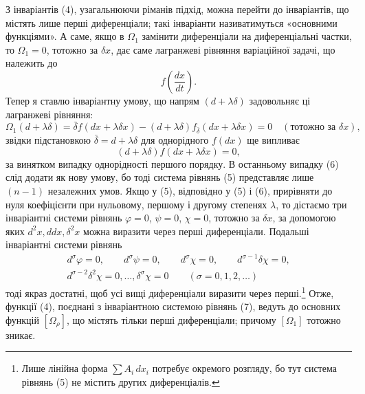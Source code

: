 \documentclass[11pt]{article}
\providecommand{\bdelta}{\bar{\delta}}
\begin{document}
З інваріантів (4), узагальнюючи ріманів підхід, можна перейти до інваріантів, що містять лише перші диференціали; такі інваріанти називатимуться «основними функціями». А саме, якщо в \(\Omega_1\) замінити диференціали на диференціальні частки, то \(\Omega_1=0\), тотожно за \(\delta x\), дає саме лагранжеві рівняння варіаційної задачі, що належить до
\[
f\!\left(\frac{dx}{dt}\right).
\]
Тепер я ставлю інваріантну умову, що напрям \((d+\lambda\delta)\) задовольняє ці лагранжеві рівняння:
\begin{equation}
\Omega_1(d+\lambda\delta)=
\bdelta f(dx+\lambda\delta x)
-(d+\lambda\delta)f_{\bdelta}(dx+\lambda\delta x)=0
\quad(\text{тотожно за }\delta x),
\tag{5}
\end{equation}
звідки підстановкою \(\bdelta=d+\lambda\delta\) для однорідного \(f(dx)\) ще випливає
\begin{equation}
(d+\lambda\delta)f(dx+\lambda\delta x)=0,
\tag{6}
\end{equation}
за винятком випадку однорідності першого порядку. В останньому випадку (6) слід додати як нову умову, бо тоді система рівнянь (5) представляє лише \((n-1)\) незалежних умов. Якщо у (5), відповідно у (5) і (6), прирівняти до нуля коефіцієнти при нульовому, першому і другому степенях \(\lambda\), то дістаємо три інваріантні системи рівнянь
\(\varphi=0\), \(\psi=0\), \(\chi=0\), тотожно за \(\delta x\), за допомогою яких \(d^2x,ddx,\delta^2x\) можна виразити через перші диференціали. Подальші інваріантні системи рівнянь
\begin{equation}
\begin{gathered}
d^\sigma\varphi=0,\qquad d^\sigma\psi=0,\qquad
d^\sigma\chi=0,\qquad d^{\sigma-1}\delta\chi=0,\\
d^{\sigma-2}\delta^2\chi=0,\ldots,\delta^\sigma\chi=0
\qquad(\sigma=0,1,2,\ldots)
\end{gathered}
\tag{7}
\end{equation}
тоді якраз достатні, щоб усі вищі диференціали виразити через перші.\footnote{Лише лінійна форма \(\sum A_i\,dx_i\) потребує окремого розгляду, бо тут система рівнянь (5) не містить других диференціалів.} Отже, функції (4), поєднані з інваріантною системою рівнянь (7), ведуть до основних функцій \([\Omega_\rho]\), що містять тільки перші диференціали; причому \([\Omega_1]\) тотожно зникає.
\end{document}
